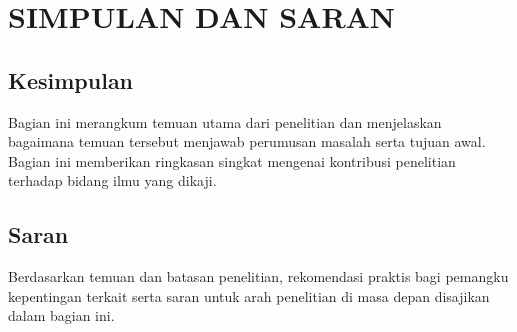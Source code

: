 \chapter{SIMPULAN DAN SARAN}

\section{Kesimpulan}
Bagian ini merangkum temuan utama dari penelitian dan menjelaskan bagaimana temuan tersebut menjawab perumusan masalah serta tujuan awal. Bagian ini memberikan ringkasan singkat mengenai kontribusi penelitian terhadap bidang ilmu yang dikaji.

\section{Saran}
Berdasarkan temuan dan batasan penelitian, rekomendasi praktis bagi pemangku kepentingan terkait serta saran untuk arah penelitian di masa depan disajikan dalam bagian ini.
